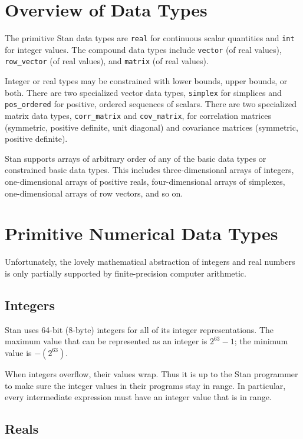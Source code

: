 \documentclass[10pt]{report}
\newcommand{\Stan}{Stan\xspace}
\newcommand{\code}[1]{{\tt #1}}
\begin{document}
\section{Overview of Data Types}

The primitive \Stan data types are \code{real} for continuous scalar
quantities and \code{int} for integer values.  The compound data
types include \code{vector} (of real values), \code{row\_vector} (of
real values), and \code{matrix} (of real values).

Integer or real types may be constrained with lower bounds, upper
bounds, or both.  There are two specialized vector data types,
\code{simplex} for simplices and \code{pos\_ordered} for positive,
ordered sequences of scalars.  There are two specialized matrix data
types, \code{corr\_matrix} and \code{cov\_matrix}, for correlation
matrices (symmetric, positive definite, unit diagonal) and covariance
matrices (symmetric, positive definite). 

\Stan supports arrays of arbitrary order of any of the basic data
types or constrained basic data types.  This includes
three-dimensional arrays of integers, one-dimensional arrays of
positive reals, four-dimensional arrays of simplexes, one-dimensional
arrays of row vectors, and so on.



\section{Primitive Numerical Data Types}

Unfortunately, the lovely mathematical abstraction of integers and
real numbers is only partially supported by finite-precision computer
arithmetic.  

\subsection{Integers}\label{int-data-type.section}

Stan uses 64-bit (8-byte) integers for all of its integer
representations.  The maximum value that can be represented
as an integer is $2^{63}-1$; the minimum value is $-(2^{63})$.

When integers overflow, their values wrap.  Thus it is up to
the \Stan programmer to make sure the integer values in their programs
stay in range.  In particular, every intermediate expression must have
an integer value that is in range.

\subsection{Reals}\label{real-data-type.section}
\end{document}
